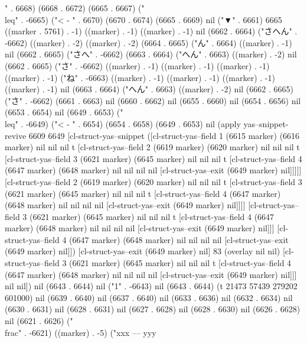 " . 6668) (6668 . 6672) (6665 . 6667) ("\\leq" . -6665) ("<
-
" . 6670) (6670 . 6674) (6665 . 6669) nil ("▼" . 6661) 6665 ((marker . 5761) . -1) ((marker) . -1) ((marker) . -1) nil (6662 . 6664) ("さへん" . -6662) ((marker) . -2) ((marker) . -2) (6664 . 6665) ("ん" . 6664) ((marker) . -1) nil (6662 . 6665) ("さへ" . -6662) (6663 . 6664) ("へん" . 6663) ((marker) . -2) nil (6662 . 6665) ("さ" . -6662) ((marker) . -1) ((marker) . -1) ((marker) . -1) ((marker) . -1) ("ね" . -6663) ((marker) . -1) ((marker) . -1) ((marker) . -1) ((marker) . -1) nil (6663 . 6664) ("へん" . 6663) ((marker) . -2) nil (6662 . 6665) ("さ" . -6662) (6661 . 6663) nil (6660 . 6662) nil (6655 . 6660) nil (6654 . 6656) nil (6653 . 6654) nil (6649 . 6653) ("\\leq" . -6649) ("<
-
" . 6654) (6654 . 6658) (6649 . 6653) nil (apply yas--snippet-revive 6609 6649 [cl-struct-yas--snippet ([cl-struct-yas--field 1 (6615 marker) (6616 marker) nil nil nil t [cl-struct-yas--field 2 (6619 marker) (6620 marker) nil nil nil t [cl-struct-yas--field 3 (6621 marker) (6645 marker) nil nil nil t [cl-struct-yas--field 4 (6647 marker) (6648 marker) nil nil nil nil [cl-struct-yas--exit (6649 marker) nil]]]]] [cl-struct-yas--field 2 (6619 marker) (6620 marker) nil nil nil t [cl-struct-yas--field 3 (6621 marker) (6645 marker) nil nil nil t [cl-struct-yas--field 4 (6647 marker) (6648 marker) nil nil nil nil [cl-struct-yas--exit (6649 marker) nil]]]] [cl-struct-yas--field 3 (6621 marker) (6645 marker) nil nil nil t [cl-struct-yas--field 4 (6647 marker) (6648 marker) nil nil nil nil [cl-struct-yas--exit (6649 marker) nil]]] [cl-struct-yas--field 4 (6647 marker) (6648 marker) nil nil nil nil [cl-struct-yas--exit (6649 marker) nil]]) [cl-struct-yas--exit (6649 marker) nil] 83 (overlay nil nil) [cl-struct-yas--field 3 (6621 marker) (6645 marker) nil nil nil t [cl-struct-yas--field 4 (6647 marker) (6648 marker) nil nil nil nil [cl-struct-yas--exit (6649 marker) nil]]] nil nil]) nil (6643 . 6644) nil ("1" . -6643) nil (6643 . 6644) (t 21473 57439 279202 601000) nil (6639 . 6640) nil (6637 . 6640) nil (6633 . 6636) nil (6632 . 6634) nil (6630 . 6631) nil (6628 . 6631) nil (6627 . 6628) nil (6628 . 6630) nil (6626 . 6628) nil (6621 . 6626) ("\\frac" . -6621) ((marker) . -5) ("xxx
---
yyy
